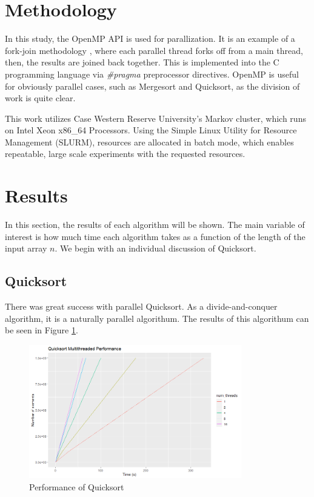 \documentclass[conference]{IEEEtran}
\begin{document}
    \section{Methodology}
    In this study, the OpenMP \cite{openmp08} API is used for parallization. 
    It is an example of a fork-join methodology	, where each parallel thread forks off from a main thread, then, the results are joined back together. 
    This is implemented into the C programming language via \textit{\#pragma} preprocessor directives. 
    OpenMP is useful for obviously parallel cases, such as Mergesort and Quicksort, as the division of work is quite clear. 
    
    This work utilizes Case Western Reserve University's Markov cluster, which runs on Intel Xeon x86\_64 Processors. 
    Using the Simple Linux Utility for Resource Management \cite{yoo_slurm_2003} (SLURM), resources are allocated in batch mode, which enables repeatable, large scale experiments with the requested resources. 
    
    \section{Results}
    In this section, the results of each algorithm will be shown. 
    The main variable of interest is how much time each algorithm takes as a function of the length of the input array $n$. 
    We begin with an individual discussion of Quicksort. 
    
    \subsection{Quicksort}
    There was great success with parallel Quicksort. 
    As a divide-and-conquer algorithm, it is a naturally parallel algorithum. 
    The results of this algorithum can be seen in Figure \ref{qck_per}. 
    \begin{figure}[h]
        \includegraphics[width=9.25cm]{qs_mt.png} 
        \caption{Performance of Quicksort}
        \label{qck_per}
    \end{figure}
    
\end{document}
